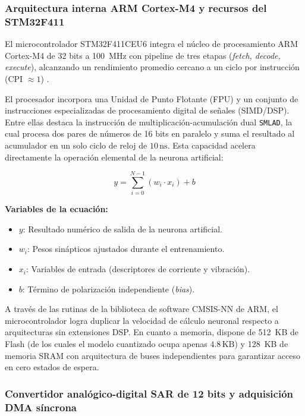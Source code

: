 \subsubsection{Arquitectura interna ARM Cortex-M4 y recursos del STM32F411}

El microcontrolador STM32F411CEU6 integra el núcleo de procesamiento ARM Cortex-M4 de 32 bits a 100~MHz con pipeline de tres etapas (\textit{fetch, decode, execute}), alcanzando un rendimiento promedio cercano a un ciclo por instrucción (CPI $\approx 1$) \citep{warden2019}.

El procesador incorpora una Unidad de Punto Flotante (FPU) y un conjunto de instrucciones especializadas de procesamiento digital de señales (SIMD/DSP). Entre ellas destaca la instrucción de multiplicación-acumulación dual \texttt{SMLAD}, la cual procesa dos pares de números de 16 bits en paralelo y suma el resultado al acumulador en un solo ciclo de reloj de $10\,\text{ns}$. Esta capacidad acelera directamente la operación elemental de la neurona artificial:

\begin{equation}
y = \sum_{i=0}^{N-1} (w_i \cdot x_i) + b
\label{eq:mac_neurona}
\end{equation}

\noindent\textbf{Variables de la ecuación:}
\begin{itemize}
    \item $y$: Resultado numérico de salida de la neurona artificial.
    \item $w_i$: Pesos sinápticos ajustados durante el entrenamiento.
    \item $x_i$: Variables de entrada (descriptores de corriente y vibración).
    \item $b$: Término de polarización independiente (\textit{bias}).
\end{itemize}

A través de las rutinas de la biblioteca de software CMSIS-NN de ARM, el microcontrolador logra duplicar la velocidad de cálculo neuronal respecto a arquitecturas sin extensiones DSP. En cuanto a memoria, dispone de 512~KB de Flash (de los cuales el modelo cuantizado ocupa apenas $4.8\,\text{KB}$) y 128~KB de memoria SRAM con arquitectura de buses independientes para garantizar acceso en cero estados de espera.

\subsubsection{Convertidor analógico-digital SAR de 12 bits y adquisición DMA síncrona}

